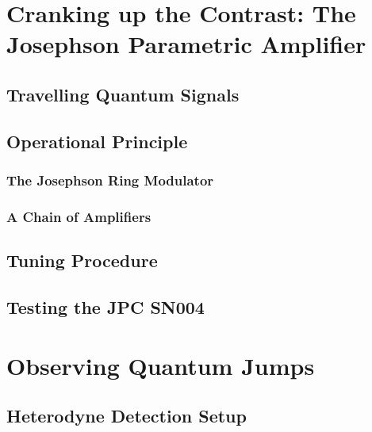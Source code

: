 \documentclass[twoside]{extarticle}
\begin{document}
\section{Cranking up the Contrast: The Josephson Parametric Amplifier}

\subsection{Travelling Quantum Signals}

\subsection{Operational Principle}

\subsubsection{The Josephson Ring Modulator}

\subsubsection{A Chain of Amplifiers}

\subsection{Tuning Procedure}
\label{sec:jpc:tuning_procedure}



\FloatBarrier
\subsection{Testing the JPC SN004}
\label{sec:jpc:testing_the_SN004}





\newpage
\section{Observing Quantum Jumps}

\subsection{Heterodyne Detection Setup}
\label{sec:quantum_jumps:heterodyne_detection_setup}

\FloatBarrier
\end{document}
